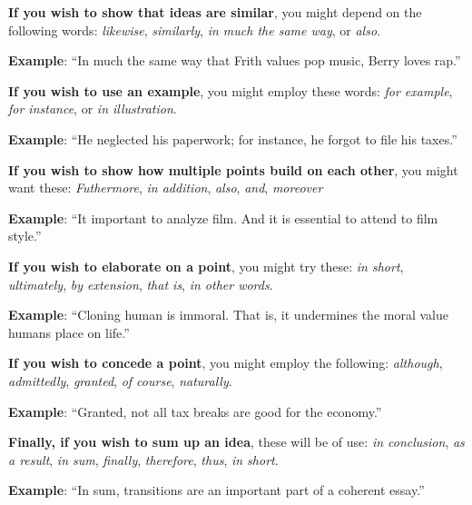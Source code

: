 \textbf{If you wish to show that ideas are similar}, you might depend on the following words: \emph{likewise}, \emph{similarly}, \emph{in much the same way}, or \emph{also}.

\tab \textbf{Example}:  ``In much the same way that Frith values pop music, Berry loves rap.''      

\textbf{If you wish to use an example}, you might employ these words: \emph{for example}, \emph{for instance}, or \emph{in illustration}.

\tab \textbf{Example}: ``He neglected his paperwork; for instance, he forgot to file his taxes.''

\textbf{If you wish to show how multiple points build on each other}, you might want these: \emph{Futhermore}, \emph{in addition}, \emph{also}, \emph{and}, \emph{moreover}

\tab \textbf{Example}: ``It important to analyze film.  And it is essential to attend to film style.''

\textbf{If you wish to elaborate on a point}, you might try these: \emph{in short}, \emph{ultimately}, \emph{by extension}, \emph{that is}, \emph{in other words}.

\tab \textbf{Example}: ``Cloning human is immoral. That is, it undermines the moral value humans place on life.''
        
\textbf{If you wish to concede a point}, you might employ the following: \emph{although}, \emph{admittedly}, \emph{granted}, \emph{of course}, \emph{naturally}.

\tab \textbf{Example}: ``Granted, not all tax breaks are good for the economy.''
        	
\textbf{Finally, if you wish to sum up an idea}, these will be of use: \emph{in conclusion}, \emph{as a result}, \emph{in sum}, \emph{finally}, \emph{therefore}, \emph{thus}, \emph{in short}.

\tab \textbf{Example}: ``In sum, transitions are an important part of a coherent essay.''